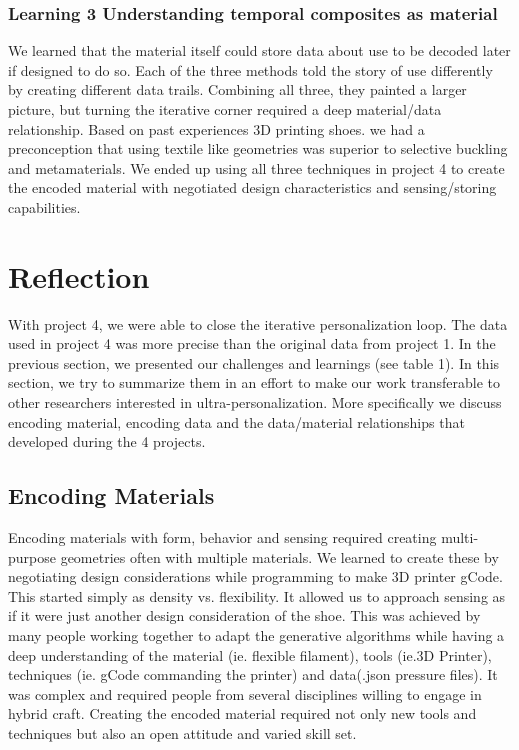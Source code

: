\subsubsection{Learning 3 Understanding temporal composites as material}

We learned that the material itself could store data about use to be decoded later if designed to do so. Each of the three methods told the story of use differently by creating different data trails. Combining all three, they painted a larger picture, but turning the iterative corner required a deep material/data relationship. Based on past experiences 3D printing shoes. we had a preconception that using textile like geometries was superior to selective buckling and metamaterials. We ended up using all three techniques in project 4 to create the encoded material with negotiated design characteristics and sensing/storing capabilities. 

\section{Reflection }
With project 4, we were able to close the iterative personalization loop. The data used in project 4 was more precise than the original data from project 1. In the previous section, we presented our challenges and learnings (see table 1). In this section, we try to summarize them in an effort to make our work transferable to other researchers interested in ultra-personalization. More specifically we discuss encoding material, encoding data and the data/material relationships that developed during the 4 projects.

\subsection{Encoding Materials}
Encoding materials with form, behavior and sensing required creating multi-purpose geometries often with multiple materials. We learned to create these by negotiating design considerations while programming to make 3D printer gCode. This started simply as  density vs. flexibility. It allowed us to approach sensing as if it were just another design consideration of the shoe. This was achieved by many people working together to adapt the generative algorithms while having a deep understanding of the material (ie. flexible filament), tools (ie.3D Printer), techniques (ie. gCode commanding the printer) and data(.json pressure files). It was complex and required people from several disciplines willing to engage in hybrid craft. Creating the encoded material required not only new tools and techniques but also an open attitude and varied skill set.

